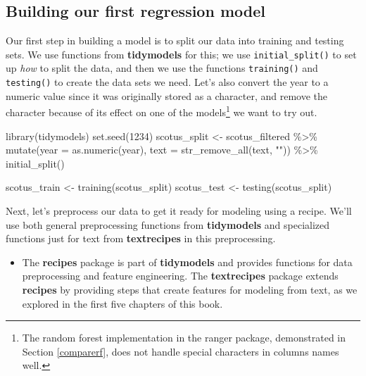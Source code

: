 \documentclass[
]{krantz}
\makeatletter
\newenvironment{Shaded}{\begin{snugshade}}{\end{snugshade}}
\newcommand{\AttributeTok}[1]{\textcolor[rgb]{0.77,0.63,0.00}{#1}}
\newcommand{\DecValTok}[1]{\textcolor[rgb]{0.00,0.00,0.81}{#1}}
\newcommand{\FunctionTok}[1]{\textcolor[rgb]{0.00,0.00,0.00}{#1}}
\newcommand{\NormalTok}[1]{#1}
\newcommand{\OtherTok}[1]{\textcolor[rgb]{0.56,0.35,0.01}{#1}}
\newcommand{\SpecialCharTok}[1]{\textcolor[rgb]{0.00,0.00,0.00}{#1}}
\newcommand{\StringTok}[1]{\textcolor[rgb]{0.31,0.60,0.02}{#1}}
\newenvironment{kframe}{%
\medskip{}
\setlength{\fboxsep}{.8em}
 \def\at@end@of@kframe{}%
 \ifinner\ifhmode%
  \def\at@end@of@kframe{\end{minipage}}%
  \begin{minipage}{\columnwidth}%
 \fi\fi%
 \def\FrameCommand##1{\hskip\@totalleftmargin \hskip-\fboxsep
 \colorbox{shadecolor}{##1}\hskip-\fboxsep
     \hskip-\linewidth \hskip-\@totalleftmargin \hskip\columnwidth}%
 \MakeFramed {\advance\hsize-\width
   \@totalleftmargin\z@ \linewidth\hsize
   \@setminipage}}%
 {\par\unskip\endMakeFramed%
 \at@end@of@kframe}
\renewenvironment{Shaded}{\begin{kframe}}{\end{kframe}}
\newenvironment{rmdblock}[1]
  {\begin{shaded*}
  \begin{itemize}[left = -1cm, labelsep = 1cm]
  \renewcommand{\labelitemi}{
    \raisebox{-.7\height}[0pt][0pt]{
      {\setkeys{Gin}{width=3em,keepaspectratio}\texttt{[image: images/\#1]}}
    }
  }
 
  \item
  }
  {
  \end{itemize}
  \end{shaded*}
  }
\newenvironment{rmdpackage}
  {\begin{rmdblock}{package}}
  {\end{rmdblock}}
\makeatother
\begin{document}
\hypertarget{firstregression}{%
\subsection{Building our first regression model}\label{firstregression}}

Our first step in building a model is to split our data into training and testing sets. We use functions from \textbf{tidymodels} for this; we use \texttt{initial\_split()} to set up \emph{how} to split the data, and then we use the functions \texttt{training()} and \texttt{testing()} to create the data sets we need. Let's also convert the year to a numeric value since it was originally stored as a character, and remove the \texttt{\textquotesingle{}} character because of its effect on one of the models\footnote{The random forest implementation in the ranger package, demonstrated in Section \ref{comparerf}, does not handle special characters in columns names well.} we want to try out.

\begin{Shaded}
\begin{Highlighting}[]
\FunctionTok{library}\NormalTok{(tidymodels)}
\FunctionTok{set.seed}\NormalTok{(}\DecValTok{1234}\NormalTok{)}
\NormalTok{scotus\_split }\OtherTok{\textless{}{-}}\NormalTok{ scotus\_filtered }\SpecialCharTok{\%\textgreater{}\%}
  \FunctionTok{mutate}\NormalTok{(}\AttributeTok{year =} \FunctionTok{as.numeric}\NormalTok{(year),}
         \AttributeTok{text =} \FunctionTok{str\_remove\_all}\NormalTok{(text, }\StringTok{"\textquotesingle{}"}\NormalTok{)) }\SpecialCharTok{\%\textgreater{}\%}
  \FunctionTok{initial\_split}\NormalTok{()}

\NormalTok{scotus\_train }\OtherTok{\textless{}{-}} \FunctionTok{training}\NormalTok{(scotus\_split)}
\NormalTok{scotus\_test }\OtherTok{\textless{}{-}} \FunctionTok{testing}\NormalTok{(scotus\_split)}
\end{Highlighting}
\end{Shaded}

Next, let's preprocess our data to get it ready for modeling using a recipe. We'll use both general preprocessing functions from \textbf{tidymodels} and specialized functions just for text from \textbf{textrecipes} in this preprocessing.

\begin{rmdpackage}
The \textbf{recipes} package \citep{R-recipes} is part of \textbf{tidymodels} and provides functions for data preprocessing and feature engineering. The \textbf{textrecipes} package \citep{textrecipes} extends \textbf{recipes} by providing steps that create features for modeling from text, as we explored in the first five chapters of this book.
\end{rmdpackage}
\end{document}
